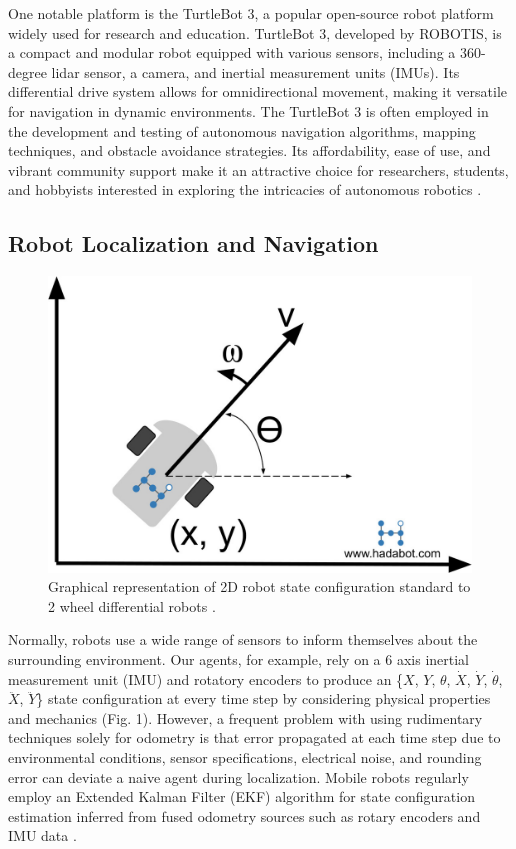 \documentclass[conference]{IEEEtran}
\begin{document}
One notable platform is the TurtleBot 3, a popular open-source robot platform widely used for research and education. TurtleBot 3, developed by ROBOTIS, is a compact and modular robot equipped with various sensors, including a 360-degree lidar sensor, a camera, and inertial measurement units (IMUs). Its differential drive system allows for omnidirectional movement, making it versatile for navigation in dynamic environments. The TurtleBot 3 is often employed in the development and testing of autonomous navigation algorithms, mapping techniques, and obstacle avoidance strategies. Its affordability, ease of use, and vibrant community support make it an attractive choice for researchers, students, and hobbyists interested in exploring the intricacies of autonomous robotics \cite{Robotis-Git}.

\subsection{Robot Localization and Navigation}
\begin{figure}
	\includegraphics[width=\linewidth]{./figs/hadabot_unicycle_diagram_01.jpg}
	\caption{Graphical representation of 2D robot state configuration standard to 2 wheel differential robots \cite{RN100}.}
\end{figure}
Normally, robots use a wide range of sensors to inform themselves about the surrounding environment. Our agents, for example, rely on a 6 axis inertial measurement unit (IMU) and rotatory encoders to produce an \{$X$, $Y$, $\theta$, $\dot{X}$, $\dot{Y}$, $\dot{\theta}$, $\ddot{X}$, $\ddot{Y}$\} state configuration at every time step by considering physical properties and mechanics (Fig. 1). However, a frequent problem with using rudimentary techniques solely for odometry is that error propagated at each time step due to environmental conditions, sensor specifications, electrical noise, and rounding error can deviate a naive agent during localization. Mobile robots regularly employ an Extended Kalman Filter (EKF) algorithm for state configuration estimation inferred from fused odometry sources such as rotary encoders and IMU data \cite{RN102}.
\end{document}
